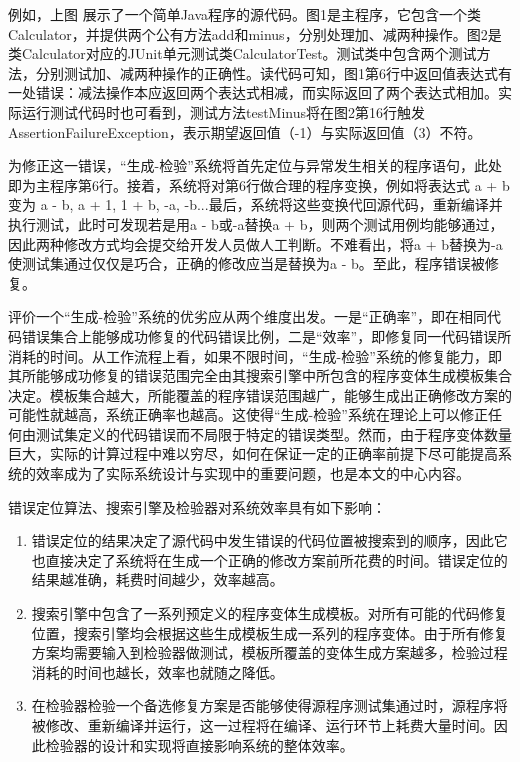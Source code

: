 例如，上图%
展示了一个简单Java程序的源代码。图1是主程序，它包含一个类Calculator，并提供两个公有方法add和minus，分别处理加、减两种操作。图2是类Calculator对应的JUnit单元测试类CalculatorTest。测试类中包含两个测试方法，分别测试加、减两种操作的正确性。读代码可知，图1第6行中返回值表达式有一处错误：减法操作本应返回两个表达式相减，而实际返回了两个表达式相加。实际运行测试代码时也可看到，测试方法testMinus将在图2第16行触发AssertionFailureException，表示期望返回值（-1）与实际返回值（3）不符。

为修正这一错误，“生成-检验”系统将首先定位与异常发生相关的程序语句，此处即为主程序第6行。接着，系统将对第6行做合理的程序变换，例如将表达式 a + b 变为 a - b, a + 1, 1 + b, -a, -b...最后，系统将这些变换代回源代码，重新编译并执行测试，此时可发现若是用a - b或-a替换a + b，则两个测试用例均能够通过，因此两种修改方式均会提交给开发人员做人工判断。不难看出，将a + b替换为-a使测试集通过仅仅是巧合，正确的修改应当是替换为a - b。至此，程序错误被修复。


评价一个“生成-检验”系统的优劣应从两个维度出发。一是“正确率”，即在相同代码错误集合上能够成功修复的代码错误比例，二是“效率”，即修复同一代码错误所消耗的时间。从工作流程上看，如果不限时间，“生成-检验”系统的修复能力，即其所能够成功修复的错误范围完全由其搜索引擎中所包含的程序变体生成模板集合决定。模板集合越大，所能覆盖的程序错误范围越广，能够生成出正确修改方案的可能性就越高，系统正确率也越高。这使得“生成-检验”系统在理论上可以修正任何由测试集定义的代码错误而不局限于特定的错误类型。然而，由于程序变体数量巨大，实际的计算过程中难以穷尽，如何在保证一定的正确率前提下尽可能提高系统的效率成为了实际系统设计与实现中的重要问题，也是本文的中心内容。

错误定位算法、搜索引擎及检验器对系统效率具有如下影响：
\begin{enumerate}
	\item 错误定位的结果决定了源代码中发生错误的代码位置被搜索到的顺序，因此它也直接决定了系统将在生成一个正确的修改方案前所花费的时间。错误定位的结果越准确，耗费时间越少，效率越高。
	\item 搜索引擎中包含了一系列预定义的程序变体生成模板。对所有可能的代码修复位置，搜索引擎均会根据这些生成模板生成一系列的程序变体。由于所有修复方案均需要输入到检验器做测试，模板所覆盖的变体生成方案越多，检验过程消耗的时间也越长，效率也就随之降低。
	\item 在检验器检验一个备选修复方案是否能够使得源程序测试集通过时，源程序将被修改、重新编译并运行，这一过程将在编译、运行环节上耗费大量时间。因此检验器的设计和实现将直接影响系统的整体效率。
\end{enumerate}

